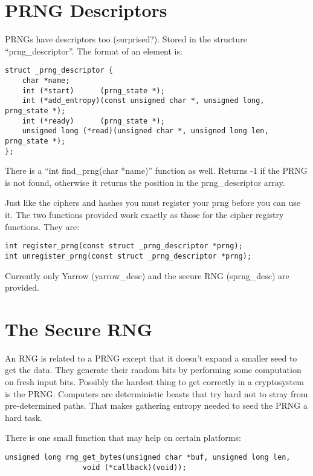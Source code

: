 \documentclass{book}
\begin{document}
\section{PRNG Descriptors}
PRNGs have descriptors too (surprised?). Stored in the structure ``prng\_descriptor''.  The format of an element is:
\begin{verbatim}
struct _prng_descriptor {
    char *name;
    int (*start)      (prng_state *);
    int (*add_entropy)(const unsigned char *, unsigned long, prng_state *);
    int (*ready)      (prng_state *);
    unsigned long (*read)(unsigned char *, unsigned long len, prng_state *);
};
\end{verbatim}

There is a ``int find\_prng(char *name)'' function as well.  Returns -1 if the PRNG is not found, otherwise it returns
the position in the prng\_descriptor array.

Just like the ciphers and hashes you must register your prng before you can use it.  The two functions provided work
exactly as those for the cipher registry functions.  They are:
\begin{verbatim}
int register_prng(const struct _prng_descriptor *prng);
int unregister_prng(const struct _prng_descriptor *prng);
\end{verbatim}
Currently only Yarrow (yarrow\_desc) and the secure RNG (sprng\_desc) are provided.

\section{The Secure RNG}
An RNG is related to a PRNG except that it doesn't expand a smaller seed to get the data.  They generate their random bits
by performing some computation on fresh input bits.  Possibly the hardest thing to get correctly in a cryptosystem is the 
PRNG.  Computers are deterministic beasts that try hard not to stray from pre-determined paths.  That makes gathering 
entropy needed to seed the PRNG a hard task.  

There is one small function that may help on certain platforms:
\begin{verbatim}
unsigned long rng_get_bytes(unsigned char *buf, unsigned long len, 
                  void (*callback)(void));
\end{verbatim}
\end{document}
